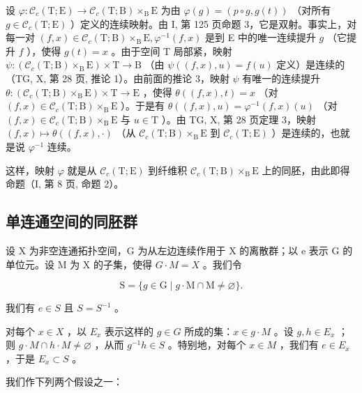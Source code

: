 设 \(\varphi\colon\mathcal{C}_{c}(\mathrm{T};\mathrm{E})\to\mathcal{C}_{c}(\mathrm{T};\mathrm{B})\times_{\mathrm{B}}\mathrm{E}\) 为由 \(\varphi(g)=(p\circ g,g(t))\) （对所有 \(g\in\mathcal{C}_{c}(\mathrm{T};\mathrm{E})\) ）定义的连续映射。由 I, 第 125 页命题 3，它是双射。事实上，对每一对 \((f,x)\in\mathcal{C}_{c}(\mathrm{T};\mathrm{B})\times_{\mathrm{B}}\mathrm{E},\varphi^{-1}(f,x)\) 是到 E 中的唯一连续提升 \(g\) （它提升 \(f\) ），使得 \(g(t)=x\) 。由于空间 T 局部紧，映射 \(\psi\colon(\mathcal{C}_{c}(\mathrm{T};\mathrm{B})\times_{\mathrm{B}}\mathrm{E})\times\mathrm{T}\to\mathrm{B}\) （由 \(\psi((f,x),u)=f(u)\) 定义）是连续的（TG, X, 第 28 页, 推论 1）。由前面的推论 3，映射 \(\psi\) 有唯一的连续提升 \(\theta\colon(\mathcal{C}_{c}(\mathrm{T};\mathrm{B})\times_{\mathrm{B}}\mathrm{E})\times\mathrm{T}\to\mathrm{E}\) ，使得 \(\theta((f,x),t)=x\) （对 \((f,x)\in\mathcal{C}_{c}(\mathrm{T};\mathrm{B})\times_{\mathrm{B}}\mathrm{E}\) ）。于是有 \(\theta((f,x),u)=\varphi^{-1}(f,x)(u)\) （对 \((f,x)\in\mathcal{C}_{c}(\mathrm{T};\mathrm{B})\times_{\mathrm{B}}\mathrm{E}\) 与 \(u\in\mathrm{T}\) ）。由 TG, X, 第 28 页定理 3，映射 \((f,x)\mapsto\theta((f,x),\cdot)\) （从 \(\mathcal{C}_{c}(\mathrm{T};\mathrm{B})\times_{\mathrm{B}}\mathrm{E}\) 到 \(\mathcal{C}_{c}(\mathrm{T};\mathrm{E})\) ）是连续的，也就是说 \(\varphi^{-1}\) 连续。

这样，映射 \(\varphi\) 就是从 \(\mathcal{C}_c(\mathrm{T};\mathrm{E})\) 到纤维积 \(\mathcal{C}_c(\mathrm{T};\mathrm{B})\times_{\mathrm{B}}\mathrm{E}\) 上的同胚，由此即得命题（I, 第 8 页, 命题 2）。

\subsection{单连通空间的同胚群}

设 X 为非空连通拓扑空间，G 为从左边连续作用于 X 的离散群；以 e 表示 G 的单位元。设 M 为 X 的子集，使得 \(G \cdot M = X\) 。我们令

\[
\mathrm{S} = \{g \in \mathrm{G} \mid g \cdot \mathrm{M} \cap \mathrm{M} \neq \varnothing \}.
\]

我们有 \(e \in S\) 且 \(S = S^{-1}\) 。

对每个 \(x \in X\) ，以 \(E_{x}\) 表示这样的 \(g \in G\) 所成的集：\(x \in g \cdot M\) 。设 \(g, h \in E_{x}\) ；则 \(g \cdot M \cap h \cdot M \neq \varnothing\) ，从而 \(g^{-1}h \in S\) 。特别地，对每个 \(x \in M\) ，我们有 \(e \in E_{x}\) ，于是 \(E_{x} \subset S\) 。

我们作下列两个假设之一：

